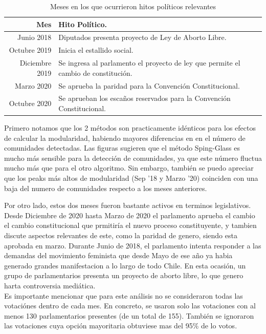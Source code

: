 \documentclass{proyectotesis}
\begin{document}
\begin{table}[ht!]
    \centering
    \caption{Meses en los que ocurrieron hitos políticos relevantes}
    \label{hp} 
    \begin{tabular}{r|l}
    Mes & Hito Político.\\
    \hline
    Junio 2018 & Diputados presenta proyecto de Ley de Aborto Libre.\\
    Octubre 2019 & Inicia el estallido social.\\
    Diciembre 2019 & Se ingresa al parlamento el proyecto de ley que permite el cambio de constitución.\\
    Marzo 2020 & Se aprueba la paridad para la Convención Constitucional.\\
    Octubre 2020 & Se aprueban los escaños reservados para la Convención Constitucional.
    \end{tabular}
\end{table}


Primero notamos que los 2 métodos son practicamente idénticos para los efectos de calcular la modularidad, habiendo mayores diferencias en en el número de comunidades detectadas. Las figuras sugieren que el método Sping-Glass es mucho más sensible para la detección de comunidades, ya que este número fluctua mucho más que para el otro algoritmo. Sin embargo, también se puedo apreciar que los peaks más altos de modularidad (Sep ’18 y Marzo ’20) coinciden con una baja del numero de comunidades respecto a los meses anteriores.

Por otro lado, estos dos meses fueron bastante activos en terminos legislativos. Desde Diciembre de 2020 hasta Marzo de 2020 el parlamento aprueba el cambio el cambio constitucional que prmitiría el nuevo proceso constituyente, y tambien
discute aspectos relevantes de este, como la paridad de genero, siendo esta aprobada en marzo. Durante Junio de 2018, el parlamento intenta responder a las demandas del movimiento feminista que desde Mayo de ese año ya habia generado grandes manifestacion a lo largo de todo Chile. En esta ocasión, un grupo de parlamentarios presenta un proyecto de aborto libre, lo que genero harta controversia mediática.\\

Es importante mencionar que para este análisis no se consideraron todas las votaciónes dentro de cada mes. En concreto, se usaron solo las votaciones con al menos 130 parlamentarios presentes (de un total de 155). También se ignoraron las votaciones cuya opción mayoritaria obtuviese mas del 95\% de lo votos. 
\end{document}
